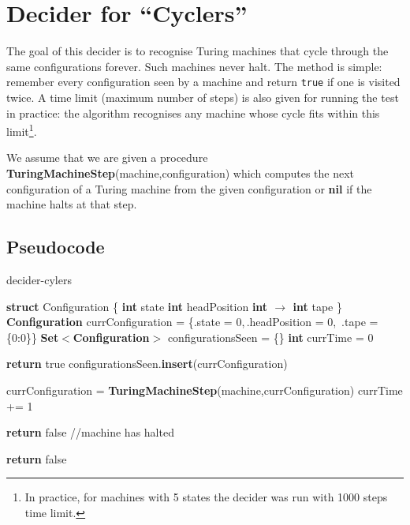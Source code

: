 
\section{Decider for ``Cyclers''}

The goal of this decider is to recognise Turing machines that cycle through the same configurations forever. Such machines never halt. The method is simple: remember every configuration seen by a machine and return \texttt{true} if one is visited twice. A time limit (maximum number of steps) is also given for running the test in practice: the algorithm recognises any machine whose cycle fits within this limit\footnote{In practice, for machines with 5 states the decider was run with 1000 steps time limit.}.

We assume that we are given a procedure \textbf{TuringMachineStep}(machine,configuration) which computes the next configuration of a Turing machine from the given configuration or \textbf{nil} if the machine halts at that step.

\subsection{Pseudocode}

\begin{algorithm}
        \caption{{\sc decider-cylers}}

        \begin{algorithmic}[1]

                \State \textbf{struct} Configuration \{
                \State \tabi\textbf{int} state
                \State \tabi\textbf{int} headPosition
                \State \tabi\textbf{int $\boldsymbol{\to}$ int} tape
                \State \}
                \State \textbf{Configuration} currConfiguration = \{.state = 0,$\,$.headPosition = 0,$\,$ .tape = \{0:0\}\}
                \State \textbf{Set$\boldsymbol{<}$Configuration$\boldsymbol{>}$} configurationsSeen = \{\}
                \State \textbf{int} currTime = 0

                \State \textbf{return} true
                \EndIf
                \State configurationsSeen.\textbf{insert}(currConfiguration)

                \State currConfiguration = \textbf{TuringMachineStep}(machine,currConfiguration)
                \State currTime += 1


                \State \textbf{return} false //machine has halted
                \EndIf
                \EndWhile

                \State \textbf{return} false
                \EndProcedure

        \end{algorithmic}
\end{algorithm}

